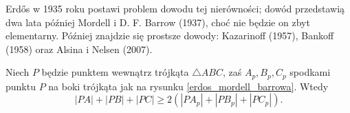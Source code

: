 %

\label{subsection_erdos_mordell}
Erdős w 1935 roku postawi problem dowodu tej nierówności; dowód przedstawią dwa lata później Mordell i D. F. Barrow (1937), choć nie będzie on zbyt elementarny.
%
%
Później znajdzie się prostsze dowody: Kazarinoff (1957), Bankoff (1958) oraz Alsina i Nelsen (2007).
%
%
%

\begin{theorem}
    Niech $P$ będzie punktem wewnątrz trójkąta $\triangle ABC$, zaś $A_p, B_p, C_p$ spodkami punktu $P$ na boki trójkąta jak na rysunku \ref{erdos_mordell_barrowa}.
    Wtedy
    \begin{equation}
        |PA| + |PB| + |PC| \ge 2 (|PA_p| + |PB_p| + |PC_p|).
    \end{equation}
\end{theorem}


